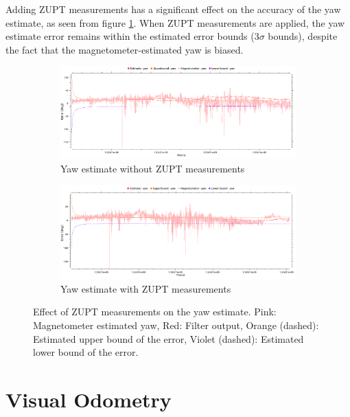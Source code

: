 Adding \gls{ZUPT} measurements has a significant effect on the accuracy of the yaw estimate, as seen from figure \ref{fig:pa:zuptYaw}. When \gls{ZUPT} measurements are applied, the yaw estimate error remains within the estimated error bounds (3$\sigma$ bounds), despite the fact that the magnetometer-estimated yaw is biased.
\begin{figure}[h]
	\centering
    \begin{subfigure}{\textwidth}
        \includegraphics[width=\textwidth]{figs/yaw-without-zupt.png}
        \caption{Yaw estimate without \gls{ZUPT} measurements}
    \end{subfigure}
    \begin{subfigure}{\textwidth}
        \includegraphics[width=\textwidth]{figs/yaw-with-zupt.png}
        \caption{Yaw estimate with \gls{ZUPT} measurements}
    \end{subfigure}
    \caption[Effect of \gls{ZUPT} measurements on the yaw estimate]{Effect of \gls{ZUPT} measurements on the yaw estimate. Pink: Magnetometer estimated yaw, Red: Filter output, Orange (dashed): Estimated upper bound of the error, Violet (dashed): Estimated lower bound of the error.}
    \label{fig:pa:zuptYaw}
\end{figure}








\section{Visual Odometry}
\label{sec:VisualOdometry}

